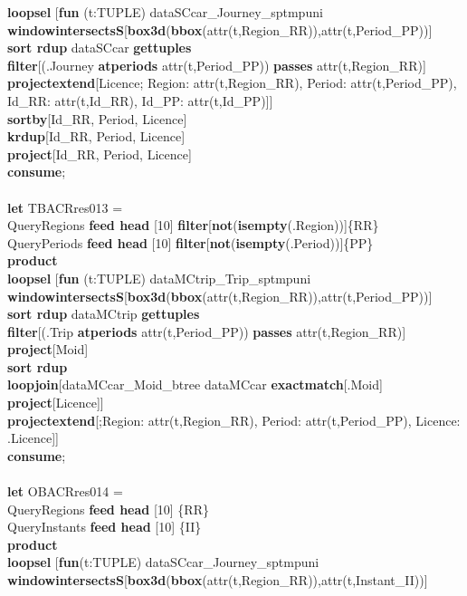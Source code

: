 \documentclass[a4paper]{article}
\newcommand{\op}[1]{\textbf{#1}}
\begin{document}
\begin{scriptsize}
\begin{tabbing}
\>\op{loopsel} [\op{fun} (t:TUPLE) dataSCcar\_Journey\_sptmpuni  \op{windowintersectsS}[\op{box3d}(\op{bbox}(attr(t,Region\_RR)),attr(t,Period\_PP))]\\
\>\>\op{sort rdup} dataSCcar  \op{gettuples}\\
\>\>\op{filter}[(.Journey \op{atperiods} attr(t,Period\_PP)) \op{passes} attr(t,Region\_RR)]\\
\>\>\op{projectextend}[Licence; Region: attr(t,Region\_RR), Period: attr(t,Period\_PP), Id\_RR: attr(t,Id\_RR), Id\_PP: attr(t,Id\_PP)]]\\
\>\op{sortby}[Id\_RR, Period, Licence]\\
\>\op{krdup}[Id\_RR, Period, Licence]\\
\>\op{project}[Id\_RR, Period, Licence]\\
\op{consume};\\
\\
\op{let} TBACRres013 =\\
\>QueryRegions \op{feed head} [10] \op{filter}[\op{not}(\op{isempty}(.Region))]\{RR\}\\
\>QueryPeriods \op{feed head} [10] \op{filter}[\op{not}(\op{isempty}(.Period))]\{PP\}\\
\>\op{product}\\
\>\op{loopsel} [\op{fun} (t:TUPLE) dataMCtrip\_Trip\_sptmpuni \op{windowintersectsS}[\op{box3d}(\op{bbox}(attr(t,Region\_RR)),attr(t,Period\_PP))]\\
\>\>\op{sort rdup} dataMCtrip \op{gettuples}\\
\>\>\op{filter}[(.Trip \op{atperiods} attr(t,Period\_PP)) \op{passes} attr(t,Region\_RR)]\\
\>\>\op{project}[Moid]\\
\>\>\op{sort rdup}\\
\>\>\op{loopjoin}[dataMCcar\_Moid\_btree dataMCcar \op{exactmatch}[.Moid] \op{project}[Licence]]\\
\>\>\op{projectextend}[;Region: attr(t,Region\_RR), Period: attr(t,Period\_PP), Licence: .Licence]]\\
\op{consume};\\
\\
\op{let} OBACRres014 =\\
\>QueryRegions  \op{feed head} [10] \{RR\}\\
\>QueryInstants \op{feed head} [10] \{II\}\\
\>\op{product}\\
\>\op{loopsel} [\op{fun}(t:TUPLE) dataSCcar\_Journey\_sptmpuni  \op{windowintersectsS}[\op{box3d}(\op{bbox}(attr(t,Region\_RR)),attr(t,Instant\_II))]\\

\end{tabbing}
\end{scriptsize}
\end{document}
